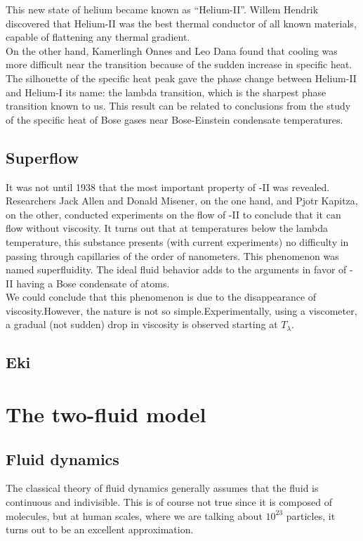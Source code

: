 \documentclass{article}
\begin{document}
This new state of helium became known as “Helium-II”. Willem Hendrik discovered that Helium-II was the best thermal conductor of all known materials, capable of flattening any thermal gradient. 
\\

On the other hand, Kamerlingh Onnes and Leo Dana found that cooling was more difficult near the transition because of the sudden increase in specific heat. The silhouette of the specific heat peak gave the phase change between Helium-II and Helium-I its name: the lambda transition, which is the sharpest phase transition known to us. This result can be related to conclusions from the study of the specific heat of Bose gases near Bose-Einstein condensate temperatures.
\\

\subsection{Superflow}

It was not until 1938 that the most important property of -II was revealed.
Researchers Jack Allen and Donald Misener, on the one hand, and Pjotr Kapitza, on the other, conducted experiments on the flow of -II to conclude that it can flow without viscosity. It turns out that at temperatures below the lambda temperature, this substance presents (with current experiments) no difficulty in passing through capillaries of the order of nanometers. This phenomenon was named superfluidity. The ideal fluid behavior adds to the arguments in favor of -II having a Bose condensate of  atoms.
\\

We could conclude that this phenomenon is due to the disappearance of viscosity.However, the nature is not so simple.Experimentally, using a viscometer, a gradual (not sudden) drop in viscosity is observed starting at $T_\lambda$.
\\

\subsection{Eki}

\section{The two-fluid model}

\subsection{Fluid dynamics}
The classical theory of fluid dynamics generally assumes that the fluid is
continuous and indivisible.  This is of course not true since it is composed
of molecules, but at human scales, where we are talking about $10^{23}$
particles, it turns out to be an excellent approximation.
\\
\end{document}

